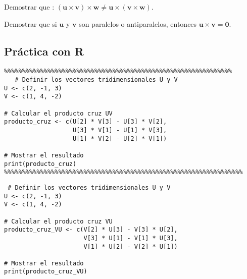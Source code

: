\begin{exercise}
 Demostrar que : $(\mathbf{u} \times \mathbf{v}) \times \mathbf{w} \neq \mathbf{u} \times (\mathbf{v} \times \mathbf{w})$.   
\end{exercise}
\begin{exercise}
 Demostrar que si $\mathbf{u}$ y $\mathbf{v}$ son paralelos o antiparalelos, entonces $\mathbf{u} \times \mathbf{v} = \mathbf{0}$.
\end{exercise}
\subsection{Práctica con R}
\begin{verbatim}
%%%%%%%%%%%%%%%%%%%%%%%%%%%%%%%%%%%%%%%%%%%%%%%%%%%%%%%%%%%%%%%
   # Definir los vectores tridimensionales U y V
U <- c(2, -1, 3)
V <- c(1, 4, -2)

# Calcular el producto cruz UV
producto_cruz <- c(U[2] * V[3] - U[3] * V[2],
                   U[3] * V[1] - U[1] * V[3],
                   U[1] * V[2] - U[2] * V[1])

# Mostrar el resultado
print(producto_cruz)
%%%%%%%%%%%%%%%%%%%%%%%%%%%%%%%%%%%%%%%%%%%%%%%%%%%%%%%%%%%%%%%%%%
\end{verbatim}
\begin{verbatim}
 # Definir los vectores tridimensionales U y V
U <- c(2, -1, 3)
V <- c(1, 4, -2)

# Calcular el producto cruz VU
producto_cruz_VU <- c(V[2] * U[3] - V[3] * U[2],
                      V[3] * U[1] - V[1] * U[3],
                      V[1] * U[2] - V[2] * U[1])

# Mostrar el resultado
print(producto_cruz_VU)   
\end{verbatim}
